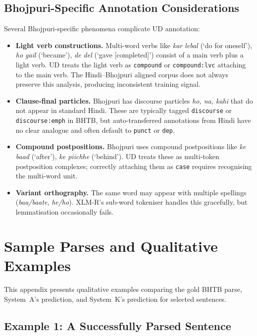 \documentclass[12pt,a4paper,oneside]{report}
\begin{document}
\section{Bhojpuri-Specific Annotation Considerations}

Several Bhojpuri-specific phenomena complicate UD annotation:

\begin{itemize}
  \item \textbf{Light verb constructions.} Multi-word verbs like
        \emph{kar lebal} (`do for oneself'), \emph{ho gail} (`became'),
        \emph{de del} (`gave [completed]') consist of a main verb plus a light
        verb. UD treats the light verb as \texttt{compound} or
        \texttt{compound:lvc} attaching to the main verb. The
        Hindi--Bhojpuri aligned corpus does not always preserve this analysis,
        producing inconsistent training signal.
  \item \textbf{Clause-final particles.} Bhojpuri has discourse particles
        \emph{ho, na, kahi} that do not appear in standard Hindi. These are
        typically tagged \texttt{discourse} or \texttt{discourse:emph} in
        BHTB, but auto-transferred annotations from Hindi have no clear
        analogue and often default to \texttt{punct} or \texttt{dep}.
  \item \textbf{Compound postpositions.} Bhojpuri uses compound postpositions
        like \emph{ke baad} (`after'), \emph{ke piichhe} (`behind'). UD
        treats these as multi-token postposition complexes; correctly
        attaching them as \texttt{case} requires recognising the multi-word
        unit.
  \item \textbf{Variant orthography.} The same word may appear with multiple
        spellings (\emph{baa/baate}, \emph{he/ho}). XLM-R's sub-word tokeniser
        handles this gracefully, but lemmatisation occasionally fails.
\end{itemize}


\chapter{Sample Parses and Qualitative Examples}
\label{app:samples}

This appendix presents qualitative examples comparing the gold BHTB parse,
System~A's prediction, and System~K's prediction for selected sentences.

\section{Example 1: A Successfully Parsed Sentence}
\end{document}
